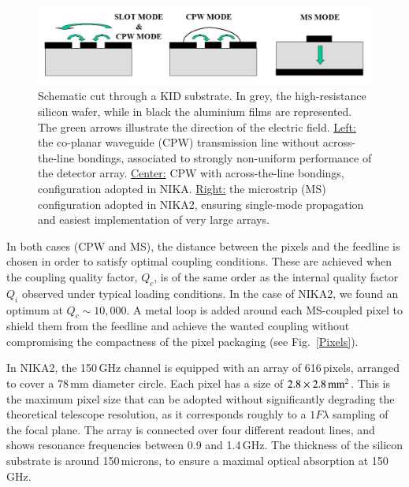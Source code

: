 \documentclass[]{aa} %
\begin{document}
\begin{figure}[h]
   \centering
    \includegraphics[width=.95\linewidth]{CPWvsMS.png}
      \caption{Schematic cut through a KID substrate. In grey, the high-resistance silicon wafer, while in black the aluminium films are represented. The green arrows illustrate the direction of the electric field. \underline{Left:} the co-planar waveguide (CPW) transmission line without across-the-line bondings, associated to strongly non-uniform performance of the detector array. \underline{Center:} CPW with across-the-line bondings, configuration adopted in NIKA. \underline{Right:} the microstrip (MS) configuration adopted in NIKA2, ensuring single-mode propagation and easiest implementation of very large arrays.}
         \label{CPWvsMS}
\end{figure}

In both cases (CPW and MS), the distance between the pixels and the feedline is chosen in order to satisfy optimal coupling conditions. These are achieved when the coupling quality factor, $Q_c$, is of the same order as the internal quality factor $Q_i$ observed under typical loading conditions. In the case of NIKA2, we found an optimum at $Q_c\sim10,000$. A metal loop is added around each MS-coupled pixel to shield them from the feedline and achieve the wanted coupling without compromising the compactness of the pixel packaging (see Fig.~\ref{Pixels}). 

In NIKA2, the 150\,GHz channel is equipped with an array of 616\,pixels, arranged to cover a 78\,mm diameter circle. Each pixel has a size of $2.8\times2.8\textrm{\,mm}^2$. This is the maximum pixel size that can be adopted without significantly degrading the theoretical telescope resolution, as it corresponds roughly to a $1 F \lambda$ sampling of the focal plane. The array is connected over four different readout lines, and shows resonance frequencies between 0.9 and 1.4\,GHz. The thickness of the silicon substrate is around 150\,microns, to ensure a maximal optical absorption at 150\,GHz. 
\end{document}
